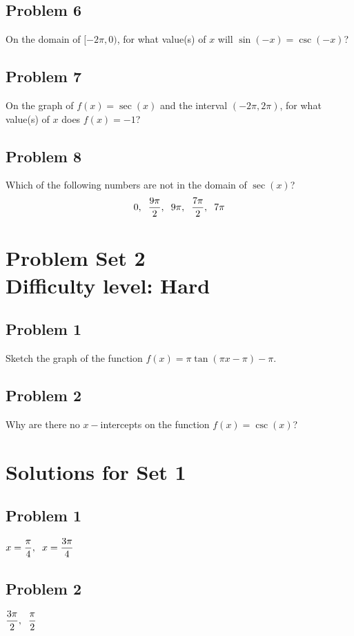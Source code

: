 \documentclass[12pt]{article}
\begin{document}
\subsection*{Problem 6}
On the domain of \([ -2\pi, 0 )\), for what value(s) of \(x\) will \(\sin(-x) = \csc(-x)\)?

\subsection*{Problem 7}
On the graph of \(f(x) = \sec(x)\) and the interval \((-2\pi, 2\pi)\), for what value(s) of \(x\) does \(f(x) = -1\)?

\subsection*{Problem 8}
Which of the following numbers are not in the domain of \(\sec(x)\)?
\[
0,\hspace{0.2cm}\dfrac{9\pi}{2},\hspace{0.2cm}9\pi,\hspace{0.2cm}\dfrac{7\pi}{2},\hspace{0.2cm}7\pi
\]

\section*{Problem Set 2\\Difficulty level: Hard}
\subsection*{Problem 1}
Sketch the graph of the function \(f(x)=\pi \tan(\pi x - \pi)-\pi\).
\subsection*{Problem 2}
Why are there no \(x-\)intercepts on the function \(f(x)=\csc(x)\)?

\newpage
\section*{Solutions for Set 1}
\subsection*{Problem 1}
\(x=\dfrac{\pi}{4},\hspace{0.2cm} x=\dfrac{3\pi}{4}\)
\subsection*{Problem 2}
\(\dfrac{3\pi}{2}, \hspace{0.2cm} \dfrac{\pi}{2}\)
\end{document}
